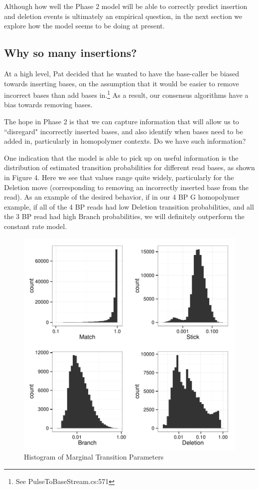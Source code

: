 \documentclass[DIV=calc, paper=a4, fontsize=11pt, twocolumn]{scrartcl}	 %
\begin{document}
Although how well the Phase 2 model will be able to correctly predict insertion and deletion events is ultimately an empirical question, in the next section we explore how the model seems to be doing at present.



\subsection*{Why so many insertions?}

At a high level, Pat decided that he wanted to have the base-caller be biased towards inserting bases, on the assumption that it would be easier to remove incorrect bases than add bases in.\footnote{See PulseToBaseStream.cs:571}  As a result, our consensus algorithms have a bias towards removing bases.

The hope in Phase 2 is that we can capture information that will allow us to ``disregard" incorrectly inserted bases, and also identify when bases need to be added in, particularly in homopolymer contexts.  Do we have such information?

One indication that the model is able to pick up on useful information is the distribution of estimated transition probabilities for different read bases, as shown in Figure 4.  Here we see that values range quite widely, particularly for the Deletion move (corresponding to removing an incorrectly inserted base from the read).  As an example of the desired behavior, if in our 4 BP G homopolymer example, if all of the 4 BP reads had low Deletion transition probabilities, and all the 3 BP read had high Branch probabilities, we will definitely outperform the constant rate model.

\begin{figure}[ht]
\includegraphics{ParameterDistributions}
\caption{Histogram of Marginal Transition Parameters}
\end{figure}
\end{document}
